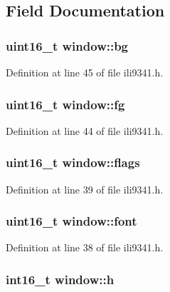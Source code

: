 \subsection{Field Documentation}
\hypertarget{structwindow_affcf5d29153103c2537542f5a4f8ba87}{
\subsubsection[{bg}]{\setlength{\rightskip}{0pt plus 5cm}uint16\-\_\-t window\-::bg}}\label{structwindow_affcf5d29153103c2537542f5a4f8ba87}


Definition at line 45 of file ili9341.\-h.

\hypertarget{structwindow_ac8739cdb3c50efcc1deaa5ab955a5e62}{
\subsubsection[{fg}]{\setlength{\rightskip}{0pt plus 5cm}uint16\-\_\-t window\-::fg}}\label{structwindow_ac8739cdb3c50efcc1deaa5ab955a5e62}


Definition at line 44 of file ili9341.\-h.

\hypertarget{structwindow_ad58fae853f87093ef4f0139df0a3f33d}{
\subsubsection[{flags}]{\setlength{\rightskip}{0pt plus 5cm}uint16\-\_\-t window\-::flags}}\label{structwindow_ad58fae853f87093ef4f0139df0a3f33d}


Definition at line 39 of file ili9341.\-h.

\hypertarget{structwindow_acee24e56db43557a46cbb5ca3fe35021}{
\subsubsection[{font}]{\setlength{\rightskip}{0pt plus 5cm}uint16\-\_\-t window\-::font}}\label{structwindow_acee24e56db43557a46cbb5ca3fe35021}


Definition at line 38 of file ili9341.\-h.

\hypertarget{structwindow_a822391abd5d09e6ce7152f68cff3ef2b}{
\subsubsection[{h}]{\setlength{\rightskip}{0pt plus 5cm}int16\-\_\-t window\-::h}}\label{structwindow_a822391abd5d09e6ce7152f68cff3ef2b}


